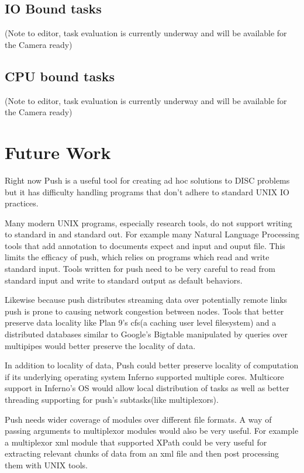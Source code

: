 \documentclass[10pt,conference,letterpaper]{IEEEtran}
\begin{document}
\subsection{IO Bound tasks}

(Note to editor, task evaluation is currently underway and will be available for the Camera ready)


\subsection{CPU bound tasks}

(Note to editor, task evaluation is currently underway and will be available for the Camera ready)     

\section{Future Work}
 
Right now Push is a useful tool for creating ad hoc solutions to DISC problems but it has difficulty handling programs that don't adhere to standard UNIX IO practices. 

Many modern UNIX programs, especially research tools, do not support writing to standard in and standard out. For example many Natural Language Processing tools that add annotation to documents expect and input and ouput file. This limits the efficacy of push, which relies on programs which read and write standard input. Tools written for push need to be very careful to read from standard input and write to standard output as default behaviors.

Likewise because push distributes streaming data over potentially remote links push is prone to causing network congestion between nodes. Tools that better preserve data locality like Plan 9's cfs(a caching user level filesystem) and a distributed databases similar to Google's Bigtable\cite{chang2006bds} manipulated by queries over multipipes would better preserve the locality of data. 

In addition to locality of data, Push could better preserve locality of computation  if its underlying operating system Inferno supported multiple cores.  Multicore support in Inferno's OS would allow local distribution of tasks as well as better threading supporting for push's subtasks(like multiplexors).

Push needs wider coverage of modules over different file formats. A way of passing arguments to multiplexor modules would also be very useful. For example a multiplexor xml module that supported XPath\cite{clark1999xpl} could be very useful for extracting relevant chunks of data from an xml file and then post processing them with UNIX tools.       
\end{document}
